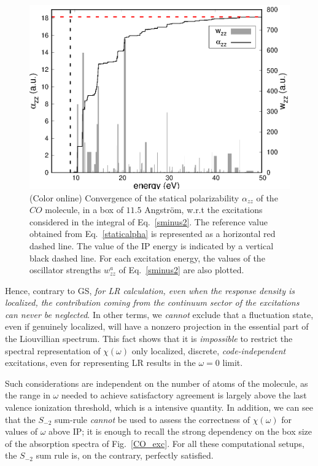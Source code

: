 \documentclass[reprint,aps,prb]{revtex4-1}
\renewcommand{\AA}{{Angstr\"om}}
\begin{document}
\begin{figure}
\includegraphics[scale=0.6]{Fig6_CO_statPolvsExc.eps}
\caption{\label{co_AlphaExc}(Color online) Convergence of the statical polarizability $\alpha_{zz}$ of the $CO$ molecule, in a box of $11.5$ \AA,  
w.r.t the excitations considered in the integral of Eq.~\eqref{sminus2}. The reference value obtained from Eq.~\eqref{staticalpha} is represented as a 
horizontal red dashed line. The value of the IP energy is indicated by a vertical black dashed line. For each excitation energy, the values of the 
oscillator strengths $w^a_{zz}$ of Eq.~\eqref{sminus2} are also plotted. }
\end{figure}
Hence, contrary to GS, \emph{for LR calculation,
even when the response density is localized, the contribution coming from the 
continuum sector of the excitations can never be neglected}. 
In other terms, we \emph{cannot} exclude that a fluctuation state, even if genuinely localized, will have a nonzero projection
in the essential part of the Liouvillian spectrum.
This fact shows that it is \emph{impossible} to restrict the spectral representation
of $\chi(\omega)$ only localized, discrete, \emph{code-independent} excitations, even for representing LR results in the $\omega=0$ limit.

Such considerations are independent on the number of atoms of the molecule, as the range in $\omega$ needed to 
achieve satisfactory agreement is largely above the last valence ionization threshold, which is
a intensive quantity.
In addition, we can see that the $S_{-2}$ sum-rule \emph{cannot} be used to assess
the correctness of $\chi(\omega)$ for values of $\omega$ above IP; it is enough to recall
the strong dependency on the box size of the absorption spectra of Fig.~\ref{CO_exc}.
For all these computational setups, the $S_{-2}$ sum rule is, on the contrary, perfectly satisfied.
\end{document}
